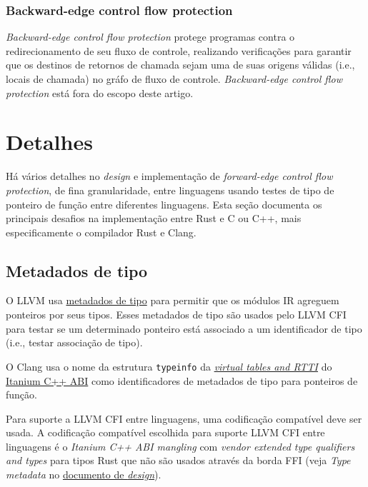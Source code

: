 \documentclass{article}
\begin{document}
\subsubsection{Backward-edge control flow protection}

\textit{Backward-edge control flow protection} protege programas contra o redirecionamento de seu fluxo de controle, realizando verificações para garantir que os destinos de retornos de chamada sejam uma de suas origens válidas (i.e., locais de chamada) no gráfo de fluxo de controle. \textit{Backward-edge control flow protection} está fora do escopo deste artigo.


\section{Detalhes}

Há vários detalhes no \textit{design} e implementação de \textit{forward-edge control flow protection}, de fina granularidade, entre linguagens usando testes de tipo de ponteiro de função entre diferentes linguagens. Esta seção documenta os principais desafios na implementação entre Rust e C ou C++, mais especificamente o compilador Rust e Clang.


\subsection{Metadados de tipo}

O LLVM usa \href{https://llvm.org/docs/TypeMetadata.html}{metadados de tipo} para permitir que os módulos IR agreguem ponteiros por seus tipos. Esses metadados de tipo são usados pelo LLVM CFI para testar se um determinado ponteiro está associado a um identificador de tipo (i.e., testar associação de tipo).

O Clang usa o nome da estrutura \texttt{typeinfo} da \href{https://itanium-cxx-abi.github.io/cxx-abi/abi.html#mangling-special-vtables}{\textit{virtual tables and RTTI}} do \href{https://itanium-cxx-abi.github.io/cxx-abi/abi.html}{Itanium C++ ABI} como identificadores de metadados de tipo para ponteiros de função.

Para suporte a LLVM CFI entre linguagens, uma codificação compatível deve ser usada. A codificação compatível escolhida para suporte LLVM CFI entre linguagens é o \textit{Itanium C++ ABI mangling} com \textit{vendor extended type qualifiers and types} para tipos Rust que não são usados através da borda FFI (veja \textit{Type metadata} no \href{https://rcvalle.com/docs/rust-cfi-design-doc.pdf}{documento de \textit{design}}).
\end{document}

